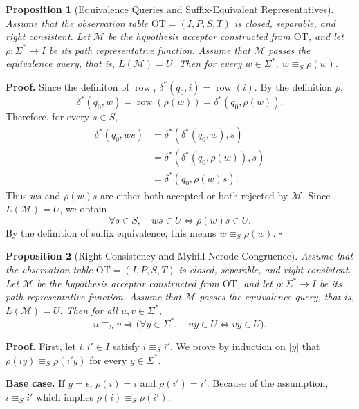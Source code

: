 \documentclass{ieice-tecrep}
\newtheorem{proposition}{Proposition}
\begin{document}
\begin{proposition}[Equivalence Queries and Suffix-Equivalent Representatives]\label{proposition-2.2-status-equivalence-implies-suffix-equivalence}
Assume that the observation table
\(\mathrm{OT}=(I,P,S,T)\) is closed, separable, and right consistent.
Let \(\mathcal{M}\) be the hypothesis acceptor constructed from \(\mathrm{OT}\),
and let \(\rho:\Sigma^*\to I\) be its path representative function.
Assume that \(\mathcal{M}\) passes the equivalence query, that is, \(L(\mathcal{M})=U\). Then for every \(w\in\Sigma^*\), \(w\equiv_S\rho(w)\).
\end{proposition}
\noindent\textbf{Proof.} Since the definiton of \(\operatorname{row}\), 
\(\delta^*(q_0,i)=\operatorname{row}(i)\). By the definition \(\rho\),
\[
\delta^*(q_0,w)=\operatorname{row}(\rho(w))
=\delta^*(q_0,\rho(w)).
\]
Therefore, for every \(s\in S\),
\[
\begin{aligned}
\delta^*(q_0,ws)
&=\delta^*(\delta^*(q_0,w),s)\\
&=\delta^*(\delta^*(q_0,\rho(w)),s)\\
&=\delta^*(q_0,\rho(w)s).
\end{aligned}
\]
Thus \(ws\) and \(\rho(w)s\) are either both accepted or both rejected
by \(\mathcal{M}\). Since \(L(\mathcal{M})=U\), we obtain
\[
\forall s\in S,\quad ws\in U\Longleftrightarrow\rho(w)s\in U.
\]
By the definition of suffix equivalence, this means
\(w\equiv_S\rho(w)\).
\hfill $\square$

\begin{proposition}[Right Consistency and Myhill-Nerode Congruence]\label{proposition-2.3-right-consistency-and-myhill-nerode-congruence}
Assume that the observation table
\(\mathrm{OT}=(I,P,S,T)\) is closed, separable, and right consistent.
Let \(\mathcal{M}\) be the hypothesis acceptor constructed from \(\mathrm{OT}\),
and let \(\rho:\Sigma^*\to I\) be its path representative function.
Assume that \(\mathcal{M}\) passes the equivalence query, that is, \(L(\mathcal{M})=U\). Then for all \(u,v\in\Sigma^*\),
\[
u\equiv_Sv
\Longrightarrow
\bigl(\forall y\in\Sigma^*,\quad uy\in U\Longleftrightarrow vy\in U\bigr).
\]
\end{proposition}
\noindent\textbf{Proof.} First, let \(i,i'\in I\) satisfy
\(i\equiv_S i'\). We prove by induction on \(|y|\) that
\(\rho(iy)\equiv_S\rho(i'y)\) for every \(y\in\Sigma^*\).

\noindent\textbf{Base case.} If \(y=\epsilon\), 
\(\rho(i)=i\) and \(\rho(i')=i'\). Because of the assumption, 
\(i\equiv_S i'\) which implies \(\rho(i)\equiv_S\rho(i')\).
\end{document}
